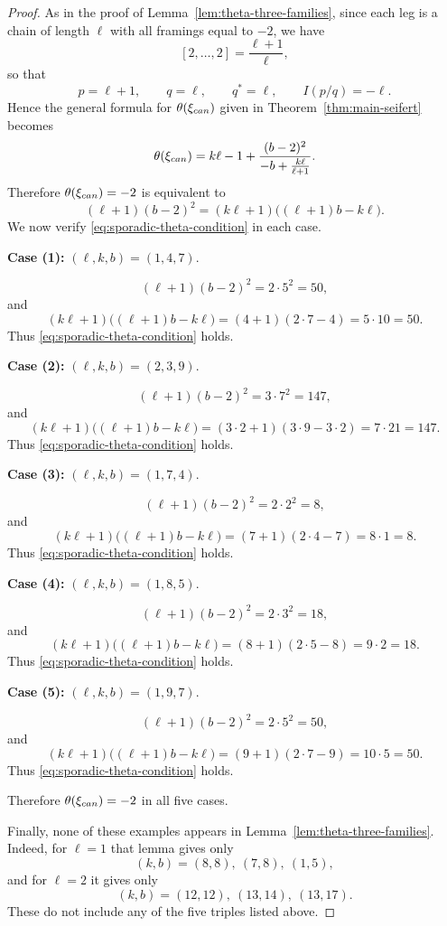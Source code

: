 \documentclass[10pt,a4paper]{amsart}
\begin{document}
\begin{proof}
As in the proof of Lemma~\ref{lem:theta-three-families}, since each leg is a chain of length $\ell$ with all framings equal to $-2$, we have
\[
[2,\dots,2]=\frac{\ell+1}{\ell},
\]
so that
\[
p=\ell+1,\qquad q=\ell,\qquad q^*=\ell,\qquad I(p/q)=-\ell.
\]
Hence the general formula for $\theta(\xi_{\rm can})$ given in Theorem~\ref{thm:main-seifert} becomes
\[
\theta(\xi_{\rm can})
=
k\ell-1+\frac{(b-2)^2}{-b+\frac{k\ell}{\ell+1}}.
\]
Therefore $\theta(\xi_{\rm can})=-2$ is equivalent to
\begin{equation}\label{eq:sporadic-theta-condition}
(\ell+1)(b-2)^2=(k\ell+1)\big((\ell+1)b-k\ell\big).
\end{equation}
We now verify \eqref{eq:sporadic-theta-condition} in each case.

\medskip

\noindent
\textbf{Case (1):} $(\ell,k,b)=(1,4,7)$.

\[
(\ell+1)(b-2)^2=2\cdot 5^2=50,
\]
and
\[
(k\ell+1)\big((\ell+1)b-k\ell\big)
=(4+1)(2\cdot 7-4)=5\cdot 10=50.
\]
Thus \eqref{eq:sporadic-theta-condition} holds.

\medskip

\noindent
\textbf{Case (2):} $(\ell,k,b)=(2,3,9)$.

\[
(\ell+1)(b-2)^2=3\cdot 7^2=147,
\]
and
\[
(k\ell+1)\big((\ell+1)b-k\ell\big)
=(3\cdot 2+1)(3\cdot 9-3\cdot 2)=7\cdot 21=147.
\]
Thus \eqref{eq:sporadic-theta-condition} holds.

\medskip

\noindent
\textbf{Case (3):} $(\ell,k,b)=(1,7,4)$.

\[
(\ell+1)(b-2)^2=2\cdot 2^2=8,
\]
and
\[
(k\ell+1)\big((\ell+1)b-k\ell\big)
=(7+1)(2\cdot 4-7)=8\cdot 1=8.
\]
Thus \eqref{eq:sporadic-theta-condition} holds.

\medskip

\noindent
\textbf{Case (4):} $(\ell,k,b)=(1,8,5)$.

\[
(\ell+1)(b-2)^2=2\cdot 3^2=18,
\]
and
\[
(k\ell+1)\big((\ell+1)b-k\ell\big)
=(8+1)(2\cdot 5-8)=9\cdot 2=18.
\]
Thus \eqref{eq:sporadic-theta-condition} holds.

\medskip

\noindent
\textbf{Case (5):} $(\ell,k,b)=(1,9,7)$.

\[
(\ell+1)(b-2)^2=2\cdot 5^2=50,
\]
and
\[
(k\ell+1)\big((\ell+1)b-k\ell\big)
=(9+1)(2\cdot 7-9)=10\cdot 5=50.
\]
Thus \eqref{eq:sporadic-theta-condition} holds.

Therefore $\theta(\xi_{\rm can})=-2$ in all five cases.

Finally, none of these examples appears in Lemma~\ref{lem:theta-three-families}. Indeed, for $\ell=1$ that lemma gives only
\[
(k,b)=(8,8),\ (7,8),\ (1,5),
\]
and for $\ell=2$ it gives only
\[
(k,b)=(12,12),\ (13,14),\ (13,17).
\]
These do not include any of the five triples listed above.
\end{proof}
\end{document}

